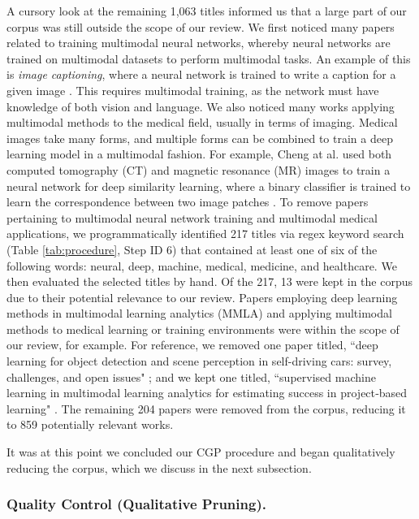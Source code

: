 \documentclass[manuscript,screen,review]{acmart}
\begin{document}
A cursory look at the remaining 1,063 titles informed us that a large part of our corpus was still outside the scope of our review. We first noticed many papers related to training multimodal neural networks, whereby neural networks are trained on multimodal datasets to perform multimodal tasks. An example of this is \textit{image captioning}, where a neural network is trained to write a caption for a given image \cite{yu2019multimodal}. This requires multimodal training, as the network must have knowledge of both vision and language. We also noticed many works applying multimodal methods to the medical field, usually in terms of imaging. Medical images take many forms, and multiple forms can be combined to train a deep learning model in a multimodal fashion. For example, Cheng at al. used both computed tomography (CT) and magnetic resonance (MR) images to train a neural network for deep similarity learning, where a binary classifier is trained to learn the correspondence between two image patches \cite{cheng2018deep}. To remove papers pertaining to multimodal neural network training and multimodal medical applications, we programmatically identified 217 titles via regex keyword search (Table \ref{tab:procedure}, Step ID 6) that contained at least one of six of the following words: neural, deep, machine, medical, medicine, and healthcare. We then evaluated the selected titles by hand. Of the 217, 13 were kept in the corpus due to their potential relevance to our review. Papers employing deep learning methods in multimodal learning analytics (MMLA) and applying multimodal methods to medical learning or training environments were within the scope of our review, for example. For reference, we removed one paper titled, ``deep learning for object detection and scene perception in self-driving cars: survey, challenges, and open issues" \cite{gupta2021deep}; and we kept one titled, ``supervised machine learning in multimodal learning analytics for estimating success in project‐based learning" \cite{spikol2018supervised}. The remaining 204 papers were removed from the corpus, reducing it to 859 potentially relevant works.

It was at this point we concluded our CGP procedure and began qualitatively reducing the corpus, which we discuss in the next subsection.

\subsubsection{Quality Control (Qualitative Pruning).} \label{subsubsec:quality_control}
\end{document}
